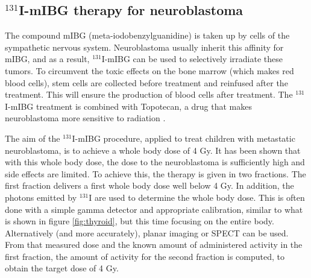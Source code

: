 \documentclass[11pt,oneside]{book}
\begin{document}
\subsection{$^{131}$I-mIBG therapy for neuroblastoma}
The compound mIBG (meta-iodobenzylguanidine) is taken up by cells of
the sympathetic nervous system. Neuroblastoma usually inherit this
affinity for mIBG, and as a result, $^{131}$I-mIBG can be used to
selectively irradiate these tumors. To circumvent the toxic effects on
the bone marrow (which makes red blood cells), stem cells are
collected before treatment and reinfused after the treatment. This
will ensure the production of blood cells after treatment. The
$^{131}$I-mIBG treatment is combined with Topotecan, a drug that makes
neuroblastoma more sensitive to radiation \cite{Gaze2015}.

The aim of the $^{131}$I-mIBG procedure, applied to treat children
with metastatic neuroblastoma, is to achieve a whole body dose of 4
Gy. It has been shown that with this whole body dose, the dose to the
neuroblastoma is sufficiently high and side effects are limited. To
achieve this, the therapy is given in two fractions. The first
fraction delivers a first whole body dose well below 4 Gy. In
addition, the photons emitted by $^{131}$I are used to determine the
whole body dose. This is often done with a simple gamma detector and
appropriate calibration, similar to what is shown in figure
\ref{fig:thyroid}, but this time focusing on the entire
body. Alternatively (and more accurately), planar imaging or SPECT can
be used. From that measured dose and the known amount of administered
activity in the first fraction, the amount of activity for the second
fraction is computed, to obtain the target dose of 4 Gy.
\end{document}
